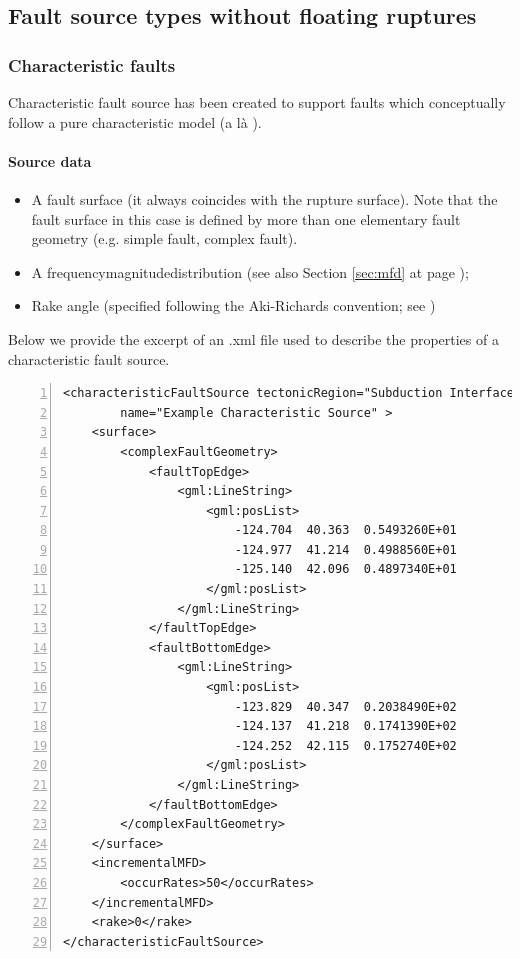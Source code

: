 \subsection{Fault source types without floating ruptures}
\subsubsection{Characteristic faults}
Characteristic fault source has been created to support 
faults which conceptually follow a pure characteristic model
(a l\`{a} \cite{schwartz1984}).
%
\paragraph{Source data}
%
\begin{itemize}
\item A fault surface (it always coincides with the rupture surface). 
    Note that the fault surface in this case is defined by more than 
    one elementary fault geometry (e.g. simple fault, complex fault).
\item A \gls{frequencymagnitudedistribution} (see also Section 
    \ref{sec:mfd} at page \pageref{sec:mfd}); 
\item Rake angle (specified following the Aki-Richards convention; 
see \citet{aki2002}) 
\end{itemize}
Below we provide the excerpt of an .xml file used to describe the 
properties of a characteristic fault source. 
\begin{Verbatim}[frame=single, commandchars=\\\{\}, fontsize=\footnotesize,
    numbers=left, numbersep=2pt]
<characteristicFaultSource tectonicRegion="Subduction Interface" id="1" 
        name="Example Characteristic Source" >
    <surface>
        <complexFaultGeometry>
            <faultTopEdge>
                <gml:LineString>
                    <gml:posList>
                        -124.704  40.363  0.5493260E+01
                        -124.977  41.214  0.4988560E+01
                        -125.140  42.096  0.4897340E+01
                    </gml:posList>
                </gml:LineString>
            </faultTopEdge>
            <faultBottomEdge>
                <gml:LineString>
                    <gml:posList>
                        -123.829  40.347  0.2038490E+02
                        -124.137  41.218  0.1741390E+02
                        -124.252  42.115  0.1752740E+02
                    </gml:posList>
                </gml:LineString>
            </faultBottomEdge>
        </complexFaultGeometry>
    </surface>
    <incrementalMFD>
        <occurRates>50</occurRates>
    </incrementalMFD>
    <rake>0</rake>
</characteristicFaultSource>
\end{Verbatim}
